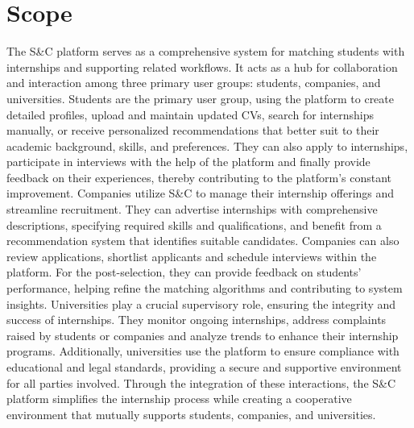 \section{Scope}
\label{sec:scope}%
The S\&C platform serves as a comprehensive system for matching students with internships and supporting related workflows. It acts as a hub for collaboration and interaction among three primary user groups: students, companies, and universities. Students are the primary user group, using the platform to create detailed profiles, upload and maintain updated CVs, search for internships manually, or receive personalized recommendations that better suit to their academic background, skills, and preferences. They can also apply to internships, participate in interviews with the help of the platform and finally provide feedback on their experiences, thereby contributing to the platform's constant improvement.
Companies utilize S\&C to manage their internship offerings and streamline recruitment. They can advertise internships with comprehensive descriptions, specifying required skills and qualifications, and benefit from a recommendation system that identifies suitable candidates. Companies can also review applications, shortlist applicants and schedule interviews within the platform. For the post-selection, they can provide feedback on students' performance, helping refine the matching algorithms and contributing to system insights.
Universities play a crucial supervisory role, ensuring the integrity and success of internships. They monitor ongoing internships, address complaints raised by students or companies and analyze trends to enhance their internship programs. Additionally, universities use the platform to ensure compliance with educational and legal standards, providing a secure and supportive environment for all parties involved.
Through the integration of these interactions, the S\&C platform simplifies the internship process while creating a cooperative environment that mutually supports students, companies, and universities.
